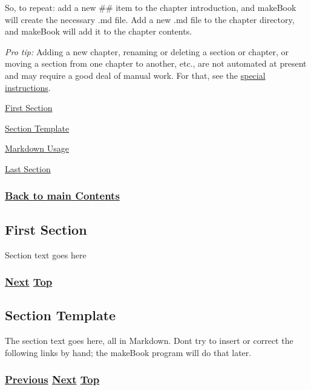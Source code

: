 \documentclass[
]{article}
\begin{document}
So, to repeat: add a new \#\# item to the chapter introduction, and
makeBook will create the necessary .md file. Add a new .md file to the
chapter directory, and makeBook will add it to the chapter contents.

\emph{Pro tip:} Adding a new chapter, renaming or deleting a section or
chapter, or moving a section from one chapter to another, etc., are not
automated at present and may require a good deal of manual work. For
that, see the
\href{https://github.com/becarpenter/book6/blob/main/utilities/chapterReorg.md}{special
instructions}.

\hyperref[first-section]{First Section}

\hyperref[section-template]{Section Template}

\hyperref[markdown-usage]{Markdown Usage}

\hyperref[last-section]{Last Section}

\subsubsection{\texorpdfstring{\hyperref[list-of-contents]{Back to main
Contents}}{Back to main Contents}}\label{back-to-main-contents-11}

\pagebreak

\subsection{First Section}\label{first-section}

Section text goes here

\subsubsection{\texorpdfstring{\hyperref[section-template]{Next}
\hyperref[chapter-template]{Top}}{Next Top}}\label{next-top-10}

\pagebreak

\subsection{Section Template}\label{section-template}

The section text goes here, all in Markdown. Don\textquotesingle t try
to insert or correct the following links by hand; the makeBook program
will do that later.

\subsubsection{\texorpdfstring{\hyperref[first-section]{Previous}
\hyperref[markdown-usage]{Next}
\hyperref[chapter-template]{Top}}{Previous Next Top}}\label{previous-next-top-40}
\end{document}
